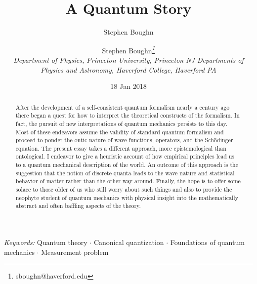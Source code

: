 \documentclass[12pt]{article}
\def\\{\hfill\break} \let\==\equiv
\begin{document}
\title{A Quantum Story}
\author {Stephen Boughn{\small\it\thanks{sboughn@haverford.edu}}\author{Stephen Boughn}
\\[2mm]
 \it Department of Physics, Princeton University, Princeton NJ\\
 \it Departments of Physics and Astronomy, Haverford College, \\
 \it Haverford PA}


\date{18 Jan 2018}
\maketitle


\begin{abstract}

After the development of a self-consistent quantum formalism nearly a century ago there began a quest for how to interpret the theoretical constructs of the formalism.  In fact, the pursuit of new interpretations of quantum mechanics persists to this day.  Most of these endeavors assume the validity of standard quantum formalism and proceed to ponder the ontic nature of wave functions, operators, and the Sch\"{o}dinger equation. The present essay takes a different approach, more epistemological than ontological. I endeavor to give a heuristic account of how empirical principles lead us to a quantum mechanical description of the world.  An outcome of this approach is the suggestion that the notion of discrete quanta leads to the wave nature and statistical behavior of matter rather than the other way around.  Finally, the hope is to offer some solace to those older of us who still worry about such things and also to provide the neophyte student of quantum mechanics with physical insight into the mathematically abstract and often baffling aspects of the theory.


\end{abstract}

{\it Keywords:} Quantum theory $\cdot$ Canonical quantization $\cdot$ Foundations of quantum mechanics $\cdot$ Measurement problem


\newpage
\end{document}
